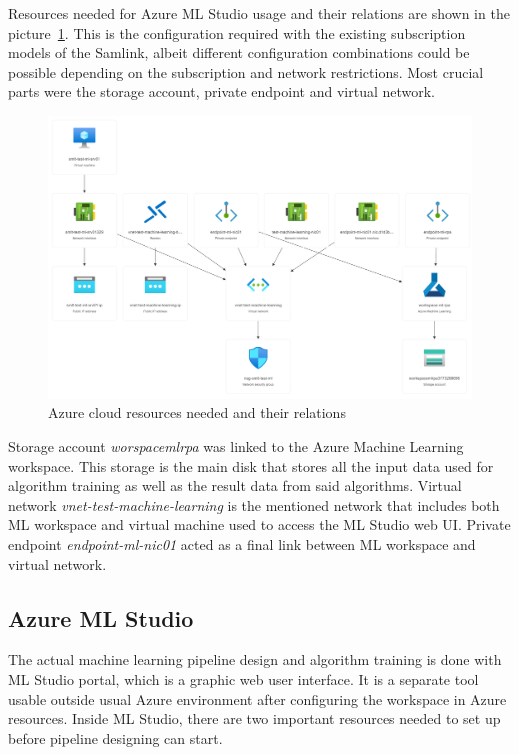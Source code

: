 Resources needed for Azure ML Studio usage and their relations
are shown in the picture~\ref{fig:azure-diagram}.
This is the configuration required
with the existing subscription models of the Samlink,
albeit different configuration combinations could be possible
depending on the subscription and network restrictions.
Most crucial parts were
the storage account, private endpoint and virtual network.

\begin{figure}[htb]
    \centering
    \includegraphics[width=\textwidth]{./appendices/azure-resource-diagram}
    \caption{Azure cloud resources needed and their relations
    \label{fig:azure-diagram}}
\end{figure}

Storage account \textit{worspacemlrpa}
was linked to the Azure Machine Learning workspace.
This storage is the main disk
that stores all the input data used for algorithm training
as well as the result data from said algorithms.
Virtual network \textit{vnet-test-machine-learning}
is the mentioned network
that includes both ML workspace and virtual machine
used to access the ML Studio web UI\@.
Private endpoint \textit{endpoint-ml-nic01}
acted as a final link between ML workspace and virtual network.



\subsection{Azure ML Studio}\label{subsec:meth-azure-ml-studio}

The actual machine learning pipeline design and algorithm training
is done with ML Studio portal,
which is a graphic web user interface.
It is a separate tool usable outside usual Azure environment
after configuring the workspace in Azure resources.
Inside ML Studio,
there are two important resources needed to set up
before pipeline designing can start.

